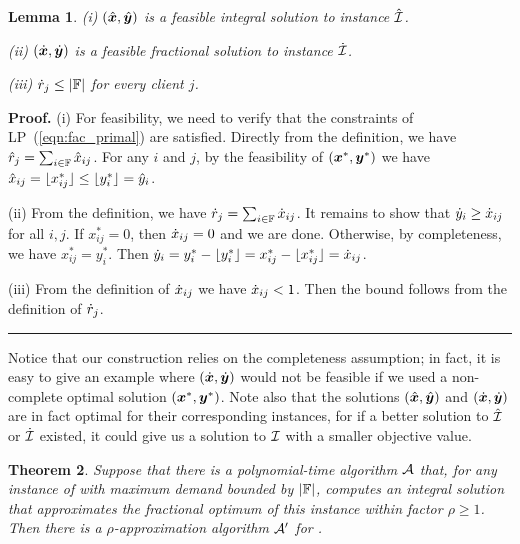 \documentclass[oneside,final]{ucr}
\newtheorem{theorem}{Theorem}
\newtheorem{lemma}[theorem]{Lemma}
\newenvironment{proof}[1][Proof]{\textbf{#1.} }{\ \rule{0.5em}{0.5em}}
\begin{document}

\begin{lemma}\label{lem: polynomial demands partition}
{\rm (i)}
  $(\hat{\boldsymbol{x}}, \hat{\boldsymbol{y}})$ is a feasible integral solution to
  instance $\hatcalI$.

\noindent
{\rm (ii)}
  $(\dot{\boldsymbol{x}}, \dot{\boldsymbol{y}})$ is a feasible fractional
  solution to instance $\dotcalI$.

\noindent
{\rm (iii)}
${\dot r}_j\leq |\mathbb{F}|$ for every client $j$.

\end{lemma}

\begin{proof}
(i) For feasibility, we need to verify that the constraints of LP~(\ref{eqn:fac_primal})
are satisfied. Directly from the definition, we have ${\hat r}_j = \sum_{i\in\mathbb{F}} {\hat x}_{ij}$.
For any $i$ and $j$, by the feasibility of $(\boldsymbol{x}^\ast,\boldsymbol{y}^\ast)$ we have
${\hat x}_{ij} = { \lfloor x_{ij}^\ast \rfloor } \le { \lfloor y^\ast_i \rfloor } = {\hat y}_i$.

(ii) From the definition, we have  ${\dot r}_j = \sum_{i\in\mathbb{F}} {\dot x}_{ij}$.
It remains to show that ${\dot y}_i \geq {\dot x}_{ij}$ for all $i,j$. 
If $x_{ij}^\ast=0$, then ${\dot x}_{ij}=0$ and we are done. 
Otherwise, by completeness, we have $x_{ij}^\ast=y_i^\ast$. 
Then  ${\dot y}_i = y_i^\ast - { \lfloor y_i^\ast \rfloor } = x_{ij}^\ast - { \lfloor x_{ij}^\ast \rfloor } ={\dot x}_{ij}$. 

(iii) From the definition of ${\dot x}_{ij}$ we have
  ${\dot x}_{ij} < 1$.  Then the bound follows from the definition of ${\dot r}_j$.
\end{proof}

Notice that our construction relies on the completeness assumption; in fact, it is
easy to give an example where $(\dot{\boldsymbol{x}}, \dot{\boldsymbol{y}})$ would not be feasible if we
used a non-complete optimal solution $(\boldsymbol{x}^\ast,\boldsymbol{y}^\ast)$.
Note also that the solutions $(\hat{\boldsymbol{x}},\hat{\boldsymbol{y}})$ and $(\dot{\boldsymbol{x}}, \dot{\boldsymbol{y}})$ are in fact
optimal for their corresponding instances, for if a better solution to $\hatcalI$ or
$\dotcalI$ existed, it could
give us a solution to $\mathcal{I}$ with a smaller objective value.


\begin{theorem}\label{thm: reduction to polynomial}
  Suppose that there is a polynomial-time algorithm $\calA$
  that, for any instance of {\FTFP} with maximum demand
  bounded by $|\mathbb{F}|$, computes an integral solution
  that approximates the fractional optimum of this instance
  within factor $\rho\geq 1$.  Then there is a
  $\rho$-approximation algorithm $\calA'$ for {\FTFP}.
\end{theorem}
\end{document}
